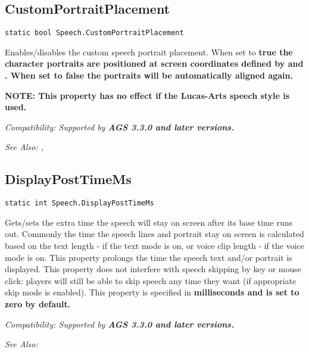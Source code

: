 \subsection{CustomPortraitPlacement}\label{Speech.CustomPortraitPlacement}%

\begin{verbatim}
static bool Speech.CustomPortraitPlacement
\end{verbatim}

Enables/disables the custom speech portrait placement. When set to \bf{true} the
character portraits are positioned at screen coordinates defined by
 and
. When set to \bf{false} the
portraits will be automatically aligned again.

\bf{NOTE:} This property has no effect if the Lucas-Arts speech style is used.

\it{Compatibility:} Supported by \bf{AGS 3.3.0} and later versions.

\it{See Also:} ,


\subsection{DisplayPostTimeMs}\label{Speech.DisplayPostTimeMs}%

\begin{verbatim}
static int Speech.DisplayPostTimeMs
\end{verbatim}

Gets/sets the extra time the speech will stay on screen after its base time runs out.
Commonly the time the speech lines and portrait stay on screen is calculated based
on the text length - if the text mode is on, or voice clip length - if the voice
mode is on. This property prolongs the time the speech text and/or portrait is displayed.
This property does not interfere with speech skipping by key or mouse click:
players will still be able to skip speech any time they want (if appropriate skip
mode is enabled).
This property is specified in \bf{milliseconds} and is set to zero by default.

\it{Compatibility:} Supported by \bf{AGS 3.3.0} and later versions.

\it{See Also:} 


